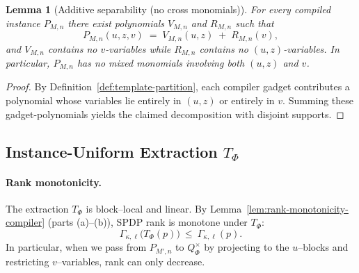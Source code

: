 \documentclass[12pt]{article}
\newtheorem{lemma}[theorem]{Lemma}
\theoremstyle{definition}
\theoremstyle{definition}
\theoremstyle{remark}
\theoremstyle{remark}
\begin{document}
\begin{lemma}[Additive separability (no cross monomials)]
\label{lem:additive-separability}
For every compiled instance $P_{M,n}$ there exist polynomials $V_{M,n}$ and $R_{M,n}$
such that
\[
P_{M,n}(u,z,v) \;=\; V_{M,n}(u,z) \;+\; R_{M,n}(v),
\]
and $V_{M,n}$ contains no $v$-variables while $R_{M,n}$ contains no $(u,z)$-variables.
In particular, $P_{M,n}$ has no mixed monomials involving both $(u,z)$ and $v$.
\end{lemma}

\begin{proof}
By Definition~\ref{def:template-partition}, each compiler gadget contributes a polynomial
whose variables lie entirely in $(u,z)$ or entirely in $v$. Summing these gadget-polynomials
yields the claimed decomposition with disjoint supports.
\end{proof}

\subsection{Instance-Uniform Extraction $T_\Phi$}
\label{sec:tphi-extraction}

\paragraph{Rank monotonicity.}
The extraction $T_\Phi$ is block--local and linear. By Lemma~\ref{lem:rank-monotonicity-compiler} (parts (a)--(b)), SPDP rank is
monotone under $T_\Phi$:
\[
\Gamma_{\kappa,\ell}\!\big(T_\Phi(p)\big)\ \le\ \Gamma_{\kappa,\ell}(p).
\]
In particular, when we pass from $P_{M',n}$ to $Q^{\times}_\Phi$ by projecting to the $u$--blocks
and restricting $v$--variables, rank can only decrease.
\end{document}
